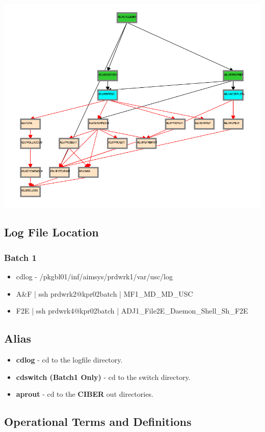 \documentclass[12pt,twoside]{article}
\begin{document}
  \includegraphics[width=15.5cm]{Pictures/billing_tc_map-27124108.png}
\subsection{Log File Location}
\label{sec-3-9}
\subsubsection{Batch 1}
\label{sec-3-9-1}

\begin{itemize}
\item cdlog - \//pkgbl01\//inf\//aimsys\//prdwrk1\//var\//usc\//log
\item A\&F | ssh prdwrk2@kpr02batch | MF1\_MD\_MD\_USC
\item F2E | ssh prdwrk4@kpr02batch | ADJ1\_File2E\_Daemon\_Shell\_Sh\_F2E
\end{itemize}
\subsection{Alias}
\label{sec-3-10}

\begin{itemize}
\item \textbf{cdlog} - cd to the logfile directory.
\item \textbf{cdswitch (Batch1 Only)} - cd to the switch directory.
\item \textbf{aprout} - cd to the \textbf{CIBER} out directories.
\end{itemize}
\subsection{Operational Terms and Definitions}
\label{sec-3-11}
\end{document}
